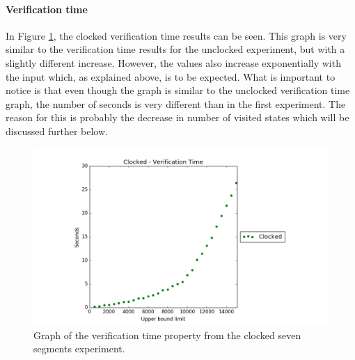 \paragraph{Verification time}
In Figure \ref{fig:clocked_verification}, the clocked verification time
results can be seen.
This graph is very similar to the verification time results for the unclocked experiment, but with a slightly different increase. However, the values also increase exponentially with the input which, as explained above, is to be expected. What is important to notice is that even though the graph is similar to the unclocked verification time graph, the number of seconds is very different than in the first experiment. The reason for this is probably the decrease in number of visited states which will be discussed further below.
\begin{figure}
    \centering
    \includegraphics[scale=0.6]{./figures/plots/clocked_verification_time.png}
\caption{Graph of the verification time property from the clocked seven segments experiment.}
\label{fig:clocked_verification}
\end{figure}
